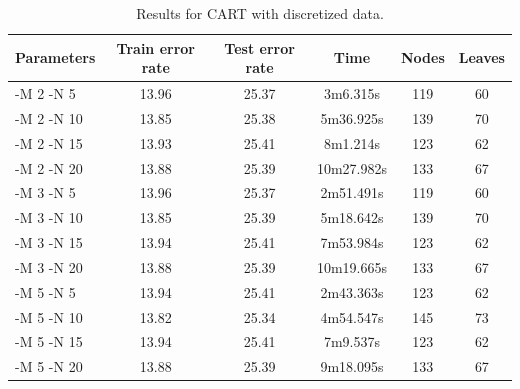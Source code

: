 \documentclass[a4paper]{llncs}
\begin{document}
\begin{table}[ht]
  \begin{center}
  \begin{tabular}{ | l | c | c | c | c | c |}
    \hline
    \textbf{Parameters} & \textbf{Train error rate} & \textbf{Test error rate} & \textbf{Time} & \textbf{Nodes} & \textbf{Leaves} \\ \hline
    -M 2 -N 5 & 13.96 & 25.37 & 3m6.315s & 119 & 60 \\ \hline
    -M 2 -N 10 & 13.85 & 25.38 & 5m36.925s & 139 & 70 \\ \hline
    -M 2 -N 15 & 13.93 & 25.41 & 8m1.214s & 123 & 62 \\ \hline
    -M 2 -N 20 & 13.88 & 25.39 & 10m27.982s & 133 & 67 \\ \hline
    
    -M 3 -N 5 & 13.96 & 25.37 & 2m51.491s & 119 & 60 \\ \hline
    -M 3 -N 10 & 13.85 & 25.39 & 5m18.642s & 139 & 70 \\ \hline
    -M 3 -N 15 & 13.94 & 25.41 & 7m53.984s & 123 & 62 \\ \hline
    -M 3 -N 20 & 13.88 & 25.39 & 10m19.665s & 133 & 67 \\ \hline
    
    -M 5 -N 5 & 13.94 & 25.41 & 2m43.363s & 123 & 62 \\ \hline
    -M 5 -N 10 & 13.82 & 25.34 & 4m54.547s & 145 & 73 \\ \hline
    -M 5 -N 15 & 13.94 & 25.41 & 7m9.537s & 123 & 62 \\ \hline
    -M 5 -N 20 & 13.88 & 25.39 & 9m18.095s & 133 & 67 \\ \hline
  \end{tabular}
  \caption{Results for CART with discretized data.}
  \label{tbl:results_cart_discr}
  \end{center}
\end{table}
\end{document}
